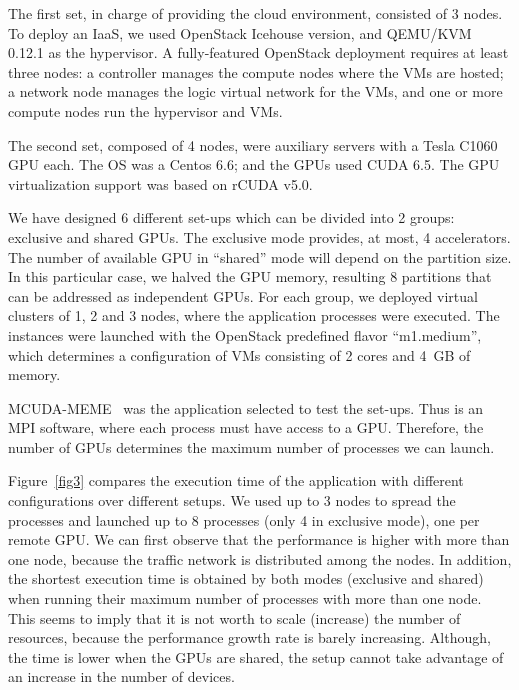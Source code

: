 \documentclass[a4paper,twoside]{article}
\begin{document}
The first set, in charge of providing the cloud environment,
consisted of 3 nodes.
To deploy an IaaS, we used OpenStack Icehouse version, and QEMU/KVM 0.12.1 as the hypervisor.
A fully-featured OpenStack deployment requires at least three nodes: a controller manages the compute nodes 
where the VMs are hosted; a network node manages the logic virtual network for the VMs, and one or more compute nodes run the hypervisor and VMs.

The second set, composed of 4 nodes, were auxiliary servers with a Tesla C1060 GPU each. 
The OS was a Centos 6.6; and the GPUs used CUDA 6.5. 
The GPU virtualization support was based on rCUDA v5.0. 

We have designed 6 different set-ups which can be divided into 2 groups: exclusive and shared GPUs. 
The exclusive mode provides, at most, 4 accelerators. 
The number of available GPU in “shared” mode will depend on the partition size. 
In this particular case, we halved the GPU memory, resulting 8 partitions that can be addressed as independent GPUs.
For each group, we deployed virtual clusters of 1, 2 and 3 nodes, where the application processes were executed. 
The instances were launched with the OpenStack predefined flavor “m1.medium”, which determines a configuration of VMs consisting of 2 cores and 4~GB of memory.

MCUDA-MEME~\cite{Liu2010} was the application selected to test the set-ups. 
Thus is an MPI software, where each process must have access to a GPU.
Therefore, the number of GPUs determines the maximum number of processes we can launch.

Figure~\ref{fig3} compares the execution time of the application with different configurations over different setups. 
We used up to 3 nodes to spread the processes and launched up to 8 processes (only 4 in exclusive mode), one per remote GPU.
We can first observe that the performance is higher with more than one node, because the traffic network is distributed among the nodes.
In addition, the shortest execution time is obtained by both modes (exclusive and shared) when running their maximum number of processes with more than one node.
This seems to imply that it is not worth to scale (increase) the number of resources, because the performance growth rate is barely increasing.
Although, the time is lower when the GPUs are shared, the setup cannot take advantage of an increase in the number of devices.
\end{document}
